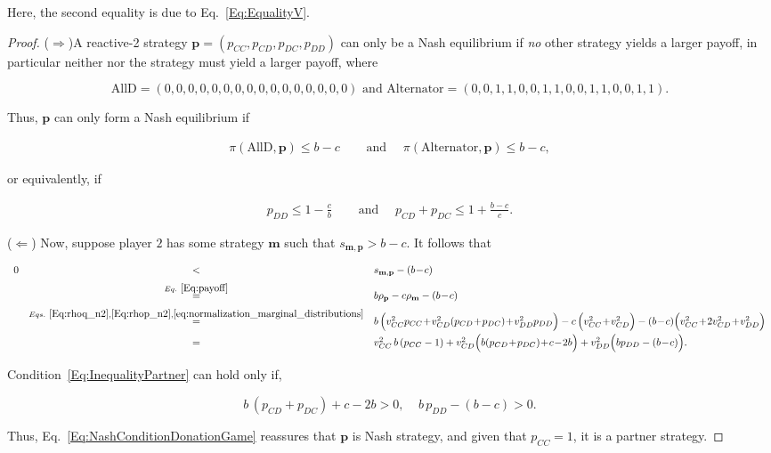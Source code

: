 \documentclass[11pt]{article}
\theoremstyle{plainCl1}
\theoremstyle{plainCl2}
\begin{document}
Here, the second equality is due to Eq.~\eqref{Eq:EqualityV}.
 
\begin{proof}
($\Rightarrow$)A reactive-2 strategy \(\mathbf{p} = (p_{CC}, p_{CD}, p_{DC},
p_{DD})\) can only be a Nash equilibrium if {\it no} other strategy yields a
larger payoff, in particular neither  nor the 
strategy must yield a larger payoff, where

$$
\text{AllD}=(0, 0, 0, 0, 0, 0, 0, 0, 0, 0, 0, 0, 0, 0, 0, 0) \text{ and } \text{Alternator}=(0, 0, 1, 1, 0, 0, 1, 1, 0, 0, 1, 1, 0, 0, 1, 1).
$$

Thus, \(\mathbf{p}\) can only form a Nash equilibrium if 

\begin{align*}
\pi(\text{AllD}, \mathbf{p}) \leq b\!-\!c & \quad \text{ and } \quad \pi(\text{Alternator}, \mathbf{p}) \leq b\!-\!c,
\end{align*}

or equivalently, if

\begin{align}\label{Eq:NashConditionDonationGame}
  p_{DD} \leq 1 - \frac{c}{b} & \quad \text{ and } \quad  p_{CD} + p_{DC} \leq 1 + \frac{b\!-\!c}{c}.
\end{align}

($\Leftarrow$) Now, suppose player $2$ has some strategy $\mathbf{m}$ such that $s_{\mathbf{m},
\mathbf{p}} > b\!-\!c$. It follows that

\begin{equation} \label{Eq:InequalityPartner}
\begin{array}{rcl}
0 	& <	&s_{\mathbf{m}, \mathbf{p}}-(b\!-\!c)\\[0.2cm]
	&\stackrel{Eq.~\eqref{Eq:payoff}}{=}	&b\rho_\mathbf{p} - c\rho_\mathbf{m}-(b\!-\!c)\\[0.2cm]
	&\stackrel{Eqs.~\eqref{Eq:rhoq_n2}, \eqref{Eq:rhop_n2}, \eqref{eq:normalization_marginal_distributions}}{=}	&b\,\Big( v^2_{CC} p_{CC} \!+\!  v^2_{CD}(p_{CD}\!+\!p_{DC}) \!+\! v^2_{DD} p_{DD}\Big) 
		- c\,\Big(v^2_{CC} \!+\! v^2_{CD}\Big) - (b\!-\!c)\Big(v^2_{CC} \!+\!  2v^2_{CD} \!+\! v^2_{DD}\Big)\\[0.2cm]
	&=	&v^2_{CC} \,b\,(p_{CC}-1) + v^2_{CD}\Big(b(p_{CD}\!+\!p_{DC})\!+\!c\!-\!2b\Big) + v^2_{DD}\Big(bp_{DD}-(b\!-\!c)\Big).
\end{array}
\end{equation}

Condition~\eqref{Eq:InequalityPartner} can hold only if,

\begin{equation}
  b \, (p_{CD}\!+\!p_{DC})\!+\!c\!-\!2b > 0,~~~~~ b\, p_{DD} - (b\!-\!c) > 0.
\end{equation}

Thus, Eq.~\eqref{Eq:NashConditionDonationGame} reassures that $\mathbf{p}$
is Nash strategy, and given that $p_{CC} = 1$, it is a partner strategy.
\end{proof}
\end{document}
